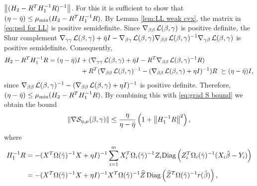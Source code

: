 $\left\Vert (H_2-R^TH_1^{-1}R)^{-1}\right\Vert$.
For this it is sufficient to show that $(\eta-\bar\eta)\le \mu_{\text{min}}(H_2-R^TH_1^{-1}R)$.
By Lemma \ref{lem:LL weak cvx}, the matrix in \eqref{eq:psd for LL} is positive
semidefinite.
Since 
$\nabla_{\beta\beta}\operatorname{\mathcal{L}}(\beta,\gamma)$ 
is positive
definite, the Shur complement 
\(
\nabla_{\gamma\gamma}\operatorname{\mathcal{L}}(\beta,\gamma)+{\bar\eta} I-
\nabla_{\beta\gamma}\operatorname{\mathcal{L}}(\beta,\gamma)\nabla_{\beta\beta}
\operatorname{\mathcal{L}}(\beta,\gamma)^{-1}
\nabla_{\gamma\beta}\operatorname{\mathcal{L}}(\beta,\gamma)
\)
is positive semidefinite. Consequently,
\[
\begin{aligned}
H_2-R^TH_1^{-1}R=
(\eta-\bar\eta) I&+ (\nabla_{\gamma\gamma}\operatorname{\mathcal{L}}(\beta,\gamma)+{\bar\eta} I-
R^T\nabla_{\beta\beta}\operatorname{\mathcal{L}}(\beta,\gamma)^{-1}R)
\\ &+R^T(\nabla_{\beta\beta}\operatorname{\mathcal{L}}(\beta,\gamma)^{-1}-(\nabla_{\beta\beta}\operatorname{\mathcal{L}}(\beta,\gamma)+\eta I)^{-1})R
\ \succeq (\eta-\bar\eta) I,
\end{aligned}
\]
since $\nabla_{\beta\beta}\operatorname{\mathcal{L}}(\beta,\gamma)^{-1}-(\nabla_{\beta\beta}\operatorname{\mathcal{L}}(\beta,\gamma)+\eta I)^{-1}$ is positive definite.
Therefore, $(\eta-\bar \eta)\le \mu_{\text{min}}(H_2-R^TH_1^{-1}R)$.
By combining this with \eqref{eq:grad S bound} we obtain the bound
\begin{equation}\label{eq:S lip bd 1}
\left\Vert \nabla \mathcal{S}_{\eta,\mu}(\beta,\gamma)\right\Vert\le
\frac{\eta}{\eta-{\bar\eta}}\left(1+\left\Vert H_1^{-1}R\right\Vert^2\right),
\end{equation}
where 
\[
\begin{aligned}
H_1^{-1}R&=-(X^T\Omega({\hat{\gamma}})^{-1}X+\eta I)^{-1}
\sum_{i=1}^mX_i^T\Omega_i({\hat{\gamma}})^{-1}Z_i
\mathrm{Diag}\left(Z_i^T\Omega_i({\hat{\gamma}})^{-1}(X_i\hat{\beta}-Y_i)\right)
\\ &=
-(X^T\Omega({\hat{\gamma}})^{-1}X+\eta I)^{-1}X^T\Omega({\hat{\gamma}})^{-1}
{\widehat Z}\,\mathrm{Diag}\left({\widehat Z}^T\Omega({\hat{\gamma}})^{-1}r(\hat{\beta})\right),
\end{aligned}
\]
